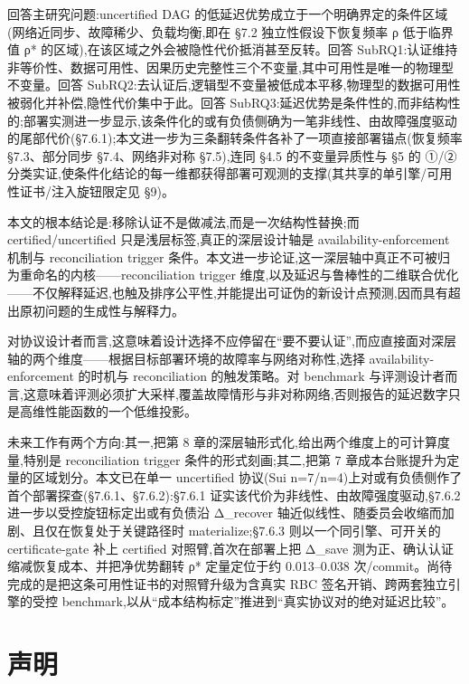 \documentclass[UTF8,fontset=windows,a4paper,11pt]{ctexart}
\begin{document}
回答主研究问题:uncertified DAG
的低延迟优势成立于一个明确界定的条件区域(网络近同步、故障稀少、负载均衡,即在
§7.2 独立性假设下恢复频率 ρ 低于临界值 ρ*
的区域),在该区域之外会被隐性代价抵消甚至反转。回答
SubRQ1:认证维持非等价性、数据可用性、因果历史完整性三个不变量,其中可用性是唯一的物理型不变量。回答
SubRQ2:去认证后,逻辑型不变量被低成本平移,物理型的数据可用性被弱化并补偿,隐性代价集中于此。回答
SubRQ3:延迟优势是条件性的,而非结构性的;部署实测进一步显示,该条件化的或有负债侧确为一笔非线性、由故障强度驱动的尾部代价(§7.6.1);本文进一步为三条翻转条件各补了一项直接部署锚点(恢复频率
§7.3、部分同步 §7.4、网络非对称 §7.5),连同 §4.5 的不变量异质性与 §5 的
①/②
分类实证,使条件化结论的每一维都获得部署可观测的支撑(其共享的单引擎/可用性证书/注入旋钮限定见
§9)。

本文的根本结论是:移除认证不是做减法,而是一次结构性替换;而
certified/uncertified 只是浅层标签,真正的深层设计轴是
availability-enforcement 机制与 reconciliation trigger
条件。本文进一步论证,这一深层轴中真正不可被归为重命名的内核------reconciliation
trigger
维度,以及延迟与鲁棒性的二维联合优化------不仅解释延迟,也触及排序公平性,并能提出可证伪的新设计点预测,因而具有超出原初问题的生成性与解释力。

对协议设计者而言,这意味着设计选择不应停留在``要不要认证'',而应直接面对深层轴的两个维度------根据目标部署环境的故障率与网络对称性,选择
availability-enforcement 的时机与 reconciliation 的触发策略。对
benchmark
与评测设计者而言,这意味着评测必须扩大采样,覆盖故障情形与非对称网络,否则报告的延迟数字只是高维性能函数的一个低维投影。

未来工作有两个方向:其一,把第 8
章的深层轴形式化,给出两个维度上的可计算度量,特别是 reconciliation
trigger 条件的形式刻画;其二,把第 7
章成本台账提升为定量的区域划分。本文已在单一 uncertified 协议(Sui
n=7/n=4)上对或有负债侧作了首个部署探查(§7.6.1、§7.6.2):§7.6.1
证实该代价为非线性、由故障强度驱动,§7.6.2
进一步以受控旋钮标定出或有负债沿 Δ\_recover
轴近似线性、随委员会收缩而加剧、且仅在恢复处于关键路径时
materialize;§7.6.3 则以一个同引擎、可开关的 certificate-gate 补上
certified 对照臂,首次在部署上把 Δ\_save
测为正、确认认证缩减恢复成本、并把净优势翻转 ρ* 定量定位于约
0.013--0.038 次/commit。尚待完成的是把这条可用性证书的对照臂升级为含真实
RBC 签名开销、跨两套独立引擎的受控
benchmark,以从``成本结构标定''推进到``真实协议对的绝对延迟比较''。

\section{声明}\label{sec:declaration}
\end{document}
